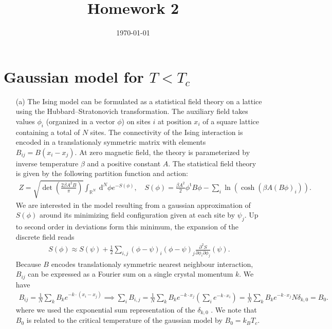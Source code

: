 \documentclass[10pt, a4paper]{article}
\title{Homework 2} %
\author{\PA} %
\date{\today} %
\begin{document}
\maketitlepage

\maketableofcontents


\footnotesize{
\section{Gaussian model for $T<T_c$}
\begin{enumerate}
  \item[(a)] The Ising model can be formulated as a statistical field theory on a lattice using the Hubbard–Stratonovich transformation. The auxiliary field takes values $\phi_i$ (organized in a vector $\phi$) on sites $i$ at position $x_i$ of a square lattice containing a total of $N$ sites. The connectivity of the Ising interaction is encoded in a translationaly symmetric matrix with elements $B_{ij} = B(x_i - x_j)$. At zero magnetic field, the theory is parameterized by inverse temperature $\beta$ and a positive constant $A$. The statistical field theory is given by the following partition function and action:
  \begin{align*}
    Z=\sqrt{\operatorname{det}\left(\frac{2 \beta A^2 B}{\pi}\right)} \int_{\mathbb{R}^N} \mathrm{~d}^N \phi e^{-S(\phi)}, \quad S(\phi)=\frac{\beta A^2}{2} \phi^{\mathrm{t}} B \phi-\sum_i \ln \left(\cosh \left(\beta A(B \phi)_i\right)\right).
  \end{align*}
  We are interested in the model resulting from a gaussian approximation of $S(\phi)$ around its minimizing field configuration given at each site by $\psi_j$. Up to second order in deviations form this minimum, the expansion of the discrete field reads
  \begin{align*}
    S(\phi) \approx S(\psi)+\frac{1}{2} \sum_{i, j}(\phi-\psi)_i(\phi-\psi)_j \frac{\partial^2 S}{\partial \phi_i \partial \phi_j}(\psi). 
  \end{align*}
  Because $B$ encodes translationaly symmetric nearest neighbour interaction, $B_{ij}$ can be expressed \cite{CitekeyBook} as a Fourier sum on a single crystal momentum $k$. We have 
  \begin{align*}
    B_{ij} = \frac{1}{N}\sum_{k} B_k e^{-k \cdot (x_i - x_j)}  \implies \sum_{i} B_{i, j} = \frac{1}{N}\sum_{k} B_k e^{-k \cdot x_j} \left(\sum_i e^{-k \cdot x_i}\right) = \frac{1}{N}\sum_{k} B_k e^{-k \cdot x_j} N\delta_{k, 0} = B_0.
  \end{align*}
  where we used the exponential sum representation of the $\delta_{k, 0}$ \cite{CitekeyBook}. We note that $B_0$ is related to the critical temperature of the gaussian model by $B_0 = k_B T_c$. 


\end{enumerate}}
\end{document}
